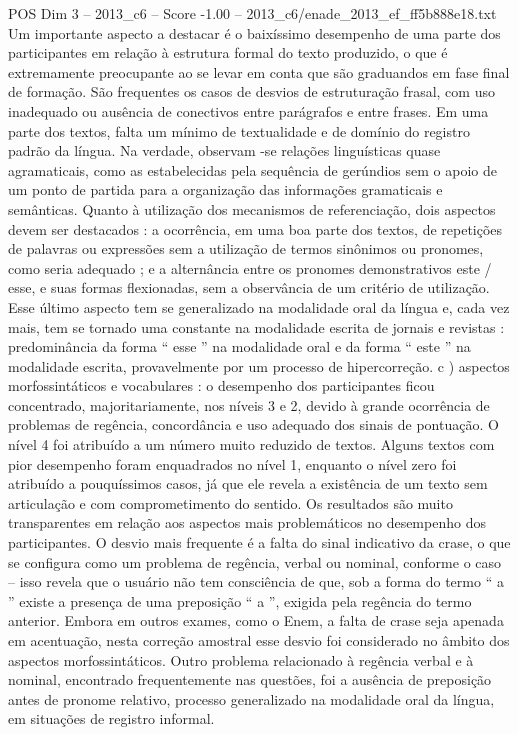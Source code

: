 \begin{textsample}{POS Dim 3 – 2013\_c6 – Score -1.00 – 2013\_c6/enade\_2013\_ef\_ff5b888e18.txt}
Um importante aspecto a destacar é o baixíssimo desempenho de uma parte dos participantes em relação à estrutura formal do texto produzido, o que é extremamente preocupante ao se levar em conta que são graduandos em fase final de formação.
São frequentes os casos de desvios de estruturação frasal, com uso inadequado ou ausência de conectivos entre parágrafos e entre frases.
Em uma parte dos textos, falta um mínimo de textualidade e de domínio do registro padrão da língua.
Na verdade, observam -se relações linguísticas quase agramaticais, como as estabelecidas pela sequência de gerúndios sem o apoio de um ponto de partida para a organização das informações gramaticais e semânticas.
Quanto à utilização dos mecanismos de referenciação, dois aspectos devem ser destacados : a ocorrência, em uma boa parte dos textos, de repetições de palavras ou expressões sem a utilização de termos sinônimos ou pronomes, como seria adequado ; e a alternância entre os pronomes demonstrativos este / esse, e suas formas flexionadas, sem a observância de um critério de utilização.
Esse último aspecto tem se generalizado na modalidade oral da língua e, cada vez mais, tem se tornado uma constante na modalidade escrita de jornais e revistas : predominância da forma “ esse ” na modalidade oral e da forma “ este ” na modalidade escrita, provavelmente por um processo de hipercorreção. c ) aspectos morfossintáticos e vocabulares : o desempenho dos participantes ficou concentrado, majoritariamente, nos níveis 3 e 2, devido à grande ocorrência de problemas de regência, concordância e uso adequado dos sinais de pontuação.
O nível 4 foi atribuído a um número muito reduzido de textos.
Alguns textos com pior desempenho foram enquadrados no nível 1, enquanto o nível zero foi atribuído a pouquíssimos casos, já que ele revela a existência de um texto sem articulação e com comprometimento do sentido.
Os resultados são muito transparentes em relação aos aspectos mais problemáticos no desempenho dos participantes.
O desvio mais frequente é a falta do sinal indicativo da crase, o que se configura como um problema de regência, verbal ou nominal, conforme o caso – isso revela que o usuário não tem consciência de que, sob a forma do termo “ a ” existe a presença de uma preposição “ a ”, exigida pela regência do termo anterior.
Embora em outros exames, como o Enem, a falta de crase seja apenada em acentuação, nesta correção amostral esse desvio foi considerado no âmbito dos aspectos morfossintáticos.
Outro problema relacionado à regência verbal e à nominal, encontrado frequentemente nas questões, foi a ausência de preposição antes de pronome relativo, processo generalizado na modalidade oral da língua, em situações de registro informal.

\end{textsample}
